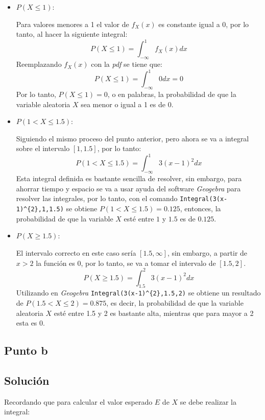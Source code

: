 \documentclass[12pt]{article}
\begin{document}
\begin{itemize}
  \item $P(X \leq 1):$

        Para valores menores a 1 el valor de $f_{X}(x)$ es constante igual a 0, por lo tanto, al hacer la siguiente integral:
        \[
        P(X\leq 1) = \int_{-\infty}^{1} f_{X}(x) dx
        \]
        Reemplazando $f_{X}(x)$ con la \textit{pdf} se tiene que:
        \[  
        P(X\leq 1) = \int_{-\infty}^{1} 0 dx = 0
        \]
        Por lo tanto, $P(X\leq 1) = 0 $, o en palabras, la probabilidad de que la variable aleatoria $X$ sea menor o igual a 1 es de 0.
  \item $P(1 < X \leq 1.5):$

        Siguiendo el mismo proceso del punto anterior, pero ahora se va a integral sobre el intervalo $[1, 1.5]$, por lo tanto:
        \[
        P(1 < X \leq 1.5) = \int_{-\infty}^{1} 3(x-1)^{2} dx
        \]
        Esta integral definida es bastante sencilla de resolver, sin embargo, para ahorrar tiempo y espacio se va a usar ayuda del software \textit{Geogebra} para resolver las integrales, por lo tanto, con el comando \lstinline|Integral(3(x-1)^{2},1,1.5)| se obtiene $P(1 < X \leq 1.5) = 0.125$, entonces, la probabilidad de que la variable $X$ esté entre $1$ y $1.5$ es de $0.125$.
  \item $P(X \geq 1.5):$

        El intervalo correcto en este caso sería $[1.5, \infty]$, sin embargo, a partir de $x > 2$ la función es 0, por lo tanto, se va a tomar el intervalo de $[1.5, 2]$.
        \[
        P(X \geq 1.5) = \int_{1.5}^{2} 3(x-1)^{2} dx
        \]
        Utilizando en \textit{Geogebra} \lstinline|Integral(3(x-1)^{2},1.5,2)| se obtiene un resultado de $P(1.5 < X \leq 2) = 0.875$, es decir, la probabilidad de que la variable aleatoria $X$ esté entre 1.5 y 2 es bastante alta, mientras que para mayor a 2 esta es 0.
\end{itemize}



\subsection{Punto b}
\subsection{Solución}

Recordando que para calcular el valor esperado $E$ de $X$ se debe realizar la integral:
\end{document}
